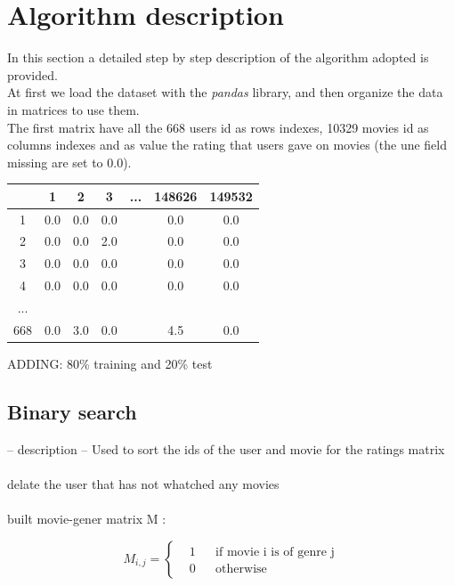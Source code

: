 \documentclass{article}
\begin{document}
\newpage

\section{Algorithm description}
In this section a detailed step by step description of the algorithm adopted is provided.\\
At first we load the dataset with the \textsl{pandas} library, and then organize the data in matrices to use them.\\
The first matrix have all the 668 users id as rows indexes, 10329 movies id as columns indexes and as value the rating that users gave on movies (the une field missing are set to 0.0).\\
\begin{center}
      \begin{tabular}{ | c | c | c | c | c | c | c |} 
        \hline
        \rowcolor{lightgray}  & 1 & 2 & 3 & ... & 148626 & 149532 \\ 
        \hline
         \cellcolor{lightgray}1 & 0.0 & 0.0 & 0.0 &  & 0.0 & 0.0 \\ 
        \hline
        \cellcolor{lightgray}2 & 0.0 & 0.0 & 2.0 &  & 0.0 & 0.0 \\ 
        \hline
        \cellcolor{lightgray}3 & 0.0 & 0.0 & 0.0 &  & 0.0 & 0.0\\
        \hline
        \cellcolor{lightgray}4 & 0.0 & 0.0 & 0.0 &  & 0.0 & 0.0\\
        \hline
        \cellcolor{lightgray}... &  &  &  &  &  & \\ 
        \hline
        \cellcolor{lightgray}668 & 0.0 & 3.0 & 0.0 &  & 4.5 & 0.0\\
        \hline
      \end{tabular}
\end{center}
ADDING: 80\% training and 20\% test

\subsection{Binary search}
-- description --
Used to sort the ids of the user and movie for the ratings matrix\\ \\
delate the user that has not whatched any movies\\ \\
built movie-gener matrix M :

\begin{equation}
      M_{i,j} = \left \{
            \begin{aligned}
                  &1 && \text{if movie i is of genre j}\\
                  &0 && \text{otherwise}
            \end{aligned} \right.
\end{equation}
\end{document}

